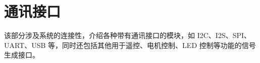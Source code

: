 \documentclass[openany, 10pt]{book}
\begin{document}







\part{通讯接口}


该部分涉及系统的连接性，介绍各种带有通讯接口的模块，如 I2C、I2S、SPI、UART、USB 等，同时还包括其他用于遥控、电机控制、LED 控制等功能的信号生成接口。



\end{document}
